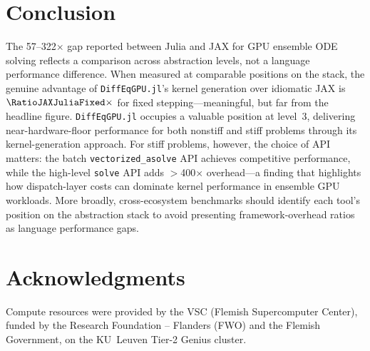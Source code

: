 \documentclass[11pt]{article}
\begin{document}
\section{Conclusion}

The 57--322$\times$ gap reported between Julia and JAX for GPU
ensemble ODE solving reflects a comparison across abstraction
levels, not a language performance difference.
When measured at comparable positions on the stack, the genuine
advantage of \texttt{DiffEqGPU.jl}'s kernel generation over
idiomatic JAX is $\RatioJAXJuliaFixed\times$ for fixed stepping---meaningful, but
far from the headline figure.
\texttt{DiffEqGPU.jl} occupies a valuable position at level~3,
delivering near-hardware-floor performance for both nonstiff and
stiff problems through its kernel-generation approach.
For stiff problems, however, the choice of API matters: the batch
\texttt{vectorized\_asolve} API achieves competitive performance,
while the high-level \texttt{solve} API adds $>$400$\times$
overhead---a finding that highlights how dispatch-layer costs can
dominate kernel performance in ensemble GPU workloads.
More broadly, cross-ecosystem benchmarks should identify each
tool's position on the abstraction stack to avoid presenting
framework-overhead ratios as language performance gaps.

\section*{Acknowledgments}

Compute resources were provided by the VSC (Flemish
Supercomputer Center), funded by the Research Foundation --
Flanders (FWO) and the Flemish Government, on the KU~Leuven
Tier-2 Genius cluster.
\end{document}
